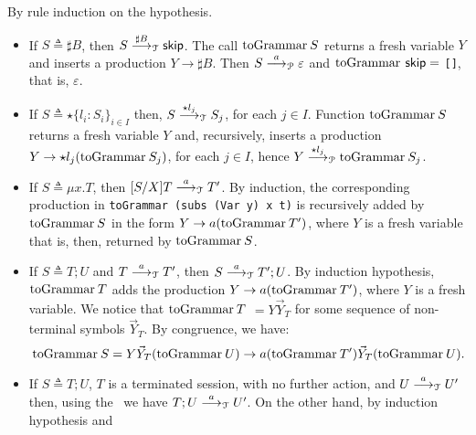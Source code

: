\begin{itemizeproof}
By rule induction on the hypothesis.
\begin{itemize}
\item If $S\triangleq \sharp B$, then
  $S \LTSderives[\sharp B] \skipk$. The call $\toGrammarf S$
  returns a fresh variable $Y$ and inserts a production
  $Y\rightarrow \sharp B$. Then $S \LTSderivesP \varepsilon$ and
  $\toGrammarf\,\skipk =$ \lstinline{[]}, that is, $\varepsilon$.
\item If $S\triangleq \star\{l_i\colon S_i\}_{i\in I}$ then,
  $S \LTSderives[\star l_j] S_j$, for each $j\in I$. Function
  $\toGrammarf S$ returns a fresh variable $Y$ and, recursively,
  inserts a production $Y\rightarrow \star l_j (\toGrammarf{S_j})$,
  for each $j\in I$, hence
  $Y \LTSderivesP[\star l_j] \toGrammarf{S_j}$.
\item If $S\triangleq \mu x.T$, then $\subs SXT \LTSderives T'$.
  By induction, the corresponding production in
  \lstinline{toGrammar (subs (Var y) x t)} is recursively added by
  $\toGrammarf S$ in the form $Y \rightarrow a (\toGrammarf{T'})$,
  where $Y$ is a fresh variable that is, then, returned by
  $\toGrammarf S$.
\item If $S\triangleq T;U$ and $T \LTSderives[a] T'$, then
  $S \LTSderives[a] T';U$.  By induction hypothesis, $\toGrammarf T$
  adds the production $Y\rightarrow a (\toGrammarf{T'})$, where $Y$
  is a fresh variable.  We notice that $\toGrammarf T$
  $= Y \vec Y_T$ for some sequence of non-terminal symbols
  $\vec Y_T$. By congruence, we have:
  \[\toGrammarf S = Y\vec Y_T(\toGrammarf U)
    \rightarrow a(\toGrammarf T')\vec Y_T(\toGrammarf U)
    .\]
\item If $S\triangleq T;U$, $T$ is a terminated session, with no further
  action, and $U \LTSderives[a] U'$ then, using the \LTS\ we have
  $T;U \LTSderives[a] U'$. On the other hand, by induction hypothesis and

\end{itemize}
\end{itemizeproof}
